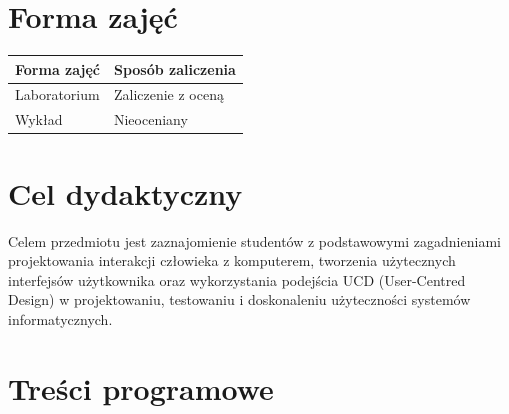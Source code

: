 \documentclass[12pt, a4paper]{article}
\begin{document}
\section{Forma zajęć}

\begin{tabular}{ll}
  \hline
  \textbf{Forma zajęć} & \textbf{Sposób zaliczenia} \\
  \hline
  Laboratorium & Zaliczenie z oceną \\
  Wykład & Nieoceniany \\
  \hline
\end{tabular}

\section{Cel dydaktyczny}

Celem przedmiotu jest zaznajomienie studentów z podstawowymi zagadnieniami projektowania interakcji człowieka z komputerem, tworzenia użytecznych interfejsów użytkownika oraz wykorzystania podejścia UCD (User-Centred Design) w projektowaniu, testowaniu i doskonaleniu użyteczności systemów informatycznych.

\section{Treści programowe}
\end{document}
